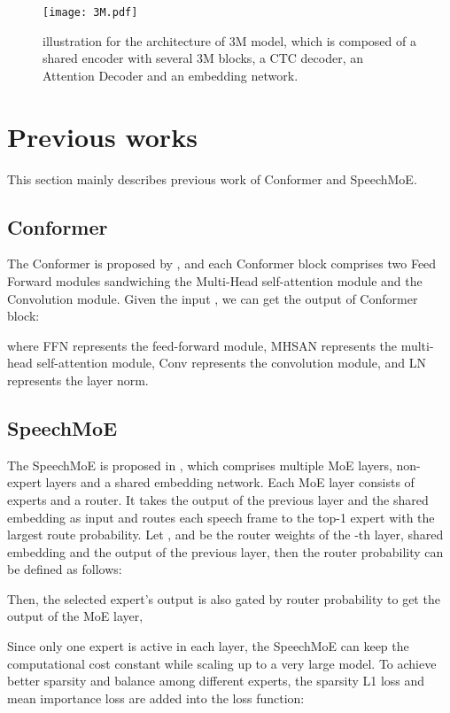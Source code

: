 \documentclass[a4paper]{article}
\begin{document}
\label{sec:typestyle}
\begin{figure*}[!tb]
\begin{minipage}[b]{0.9\linewidth}
  \centering
  \centerline{\texttt{[image: 3M.pdf]}}
\end{minipage}
\caption{
illustration for the architecture of 3M model, which is composed of a shared encoder with several 3M blocks, a CTC decoder, an Attention Decoder and an embedding network.
}
\end{figure*}

\section{Previous works}

This section mainly describes previous work of Conformer and SpeechMoE.
\subsection{Conformer}
The Conformer is proposed by \cite{conformer}, and each Conformer block comprises two Feed Forward modules sandwiching the Multi-Head self-attention module and the Convolution module. Given the input , we can get the output  of Conformer block:




where FFN represents the feed-forward module, MHSAN represents the multi-head self-attention module, Conv represents the convolution module, and LN represents the layer norm.
\subsection{SpeechMoE}
The SpeechMoE is proposed in \cite{you2021speechmoe}, which comprises multiple MoE layers, non-expert layers and a shared embedding network. Each MoE layer consists of  experts and a router. It takes the output of the previous layer
and the shared embedding as input and routes each speech frame to the top-1 expert with the largest route probability. Let ,  and  be the router weights of the -th layer, shared embedding and the output of the previous layer, then the router probability can be defined as follows:




Then, the selected expert's output is also gated by router probability to get the output of the MoE layer,


Since only one expert is active in each layer, the SpeechMoE can keep the computational cost constant while scaling up to a very large model.
To achieve better sparsity and balance among different experts, the sparsity L1 loss  and mean importance loss  are added into the loss function:
\end{document}
